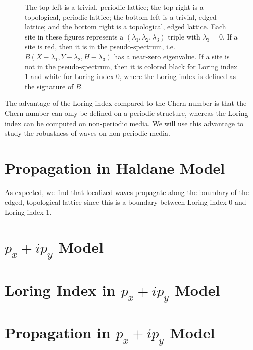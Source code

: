 \documentclass[a4paper]{article}
\begin{document}
\begin{figure}
%
%
\caption{The top left is a trivial, periodic lattice; the top right is a topological, periodic lattice; the bottom left is a trivial, edged lattice; and the bottom right is a topological, edged lattice. Each site in these figures represents a $(\lambda_1,\lambda_2,\lambda_3)$ triple with $\lambda_3 = 0$. If a site is red, then it is in the pseudo-spectrum, i.e. $B(X - \lambda_1, Y - \lambda_2, H - \lambda_3)$ has a near-zero eigenvalue. If a site is not in the pseudo-spectrum, then it is colored black for Loring index 1 and white for Loring index 0, where the Loring index is defined as the signature of $B$.\\
}%
\label{fig:Loring Haldane}%
\end{figure}
The advantage of the Loring index compared to the Chern number is that the Chern number can only be defined on a periodic structure, whereas the Loring index can be computed on non-periodic media. We will use this advantage to study the robustness of waves on non-periodic media.

\section{Propagation in Haldane Model}
As expected, we find that localized waves propagate along the boundary of the edged, topological lattice since this is a boundary between Loring index 0 and Loring index 1.


\section{\texorpdfstring{$p_x + ip_y$}{px + ipy} Model}
\section{Loring Index in \texorpdfstring{$p_x + ip_y$}{px + ipy} Model}
\section{Propagation in \texorpdfstring{$p_x + ip_y$}{px + ipy} Model}
\end{document}
